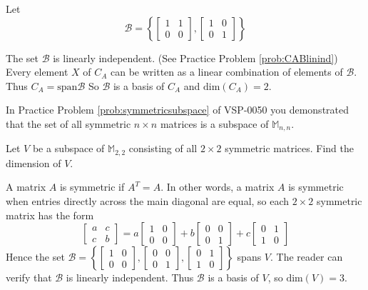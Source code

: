 \documentclass{ximera}
\begin{document}
\begin{example}
\begin{explanation}
Let 
$$\mathcal{B}=\left\{\begin{bmatrix}1&1\\0&0\end{bmatrix},\begin{bmatrix}1&0\\0&1\end{bmatrix}\right\}$$

The set $\mathcal{B}$ is linearly independent. (See Practice Problem \ref{prob:CABlinind}) Every element $X$ of $C_A$ can be written as a linear combination of elements of $\mathcal{B}$.  Thus $C_A=\mbox{span}\mathcal{B}$
 So $\mathcal{B}$ is a basis of $C_A$ and $\mbox{dim}(C_A) = 2$.
\end{explanation}
\end{example}

\begin{example}\label{ex:symmetricmatsubspace} 
In Practice Problem \ref{prob:symmetricsubspace} of VSP-0050 you demonstrated that the set of all symmetric $n\times n$ matrices is a subspace of $\mathbb{M}_{n,n}$.

Let $V$ be a subspace of $\mathbb{M}_{2,2}$ consisting of all $2\times 2$ symmetric matrices.  Find the dimension of $V$.

\begin{explanation}
A matrix $A$ is symmetric if $A^{T} = A$. In other words, a matrix $A$ is symmetric when entries directly across the main diagonal are equal, so each $2 \times 2$ symmetric matrix has the form
$$
\begin{bmatrix}
a & c \\
c & b
\end{bmatrix}
= a\begin{bmatrix}
1 & 0 \\
0 & 0
\end{bmatrix}
+ b\begin{bmatrix}
0 & 0 \\
0 & 1
\end{bmatrix}
+ c\begin{bmatrix}
0 & 1 \\
1 & 0
\end{bmatrix}
$$
Hence the set 
$\mathcal{B} = \left\{
\begin{bmatrix}
1 & 0 \\
0 & 0
\end{bmatrix}, \begin{bmatrix}
0 & 0 \\
0 & 1
\end{bmatrix}, \begin{bmatrix}
0 & 1 \\
1 & 0
\end{bmatrix}
\right\}$
 spans $V$. The reader can verify that $\mathcal{B}$ is linearly independent. Thus $\mathcal{B}$ is a basis of $V$, so $\mbox{dim}(V) = 3$.
\end{explanation}
\end{example}
\end{document}
